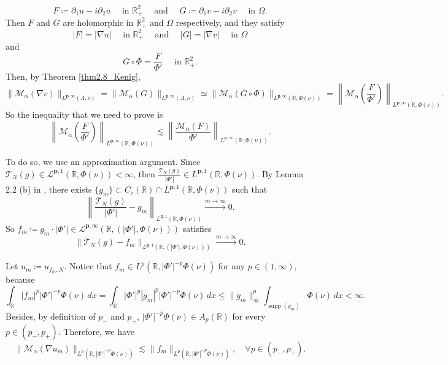 \documentclass[12pt]{amsart}
\newcommand{\R}{\mathbb{R}}
\newcommand{\supp}[1]{\operatorname{supp}\left(#1\right) }
\theoremstyle{plain}
\theoremstyle{definition}
\numberwithin{equation}{section}
\begin{document}
\[
F\coloneqq \partial_1 u-i\partial_2 u
\quad\text{ in }\R_{+}^{2}
\quad
\text{ and }
\quad 
G\coloneqq \partial_1 v-i\partial_2 v
\quad \text{ in }\Omega.
\]
Then $F$ and $G$ are holomorphic in $\R_{+}^{2}$ and $\Omega$ respectively, and they satisfy
\[
|F|=|\nabla u|
\quad\text{ in }\R_{+}^{2}
\quad
\text{ and }
\quad 
|G|=|\nabla v|
\quad\text{ in }\Omega
\]
and
\[
G\circ\Phi=\frac{F}{\Phi'}\quad \text{ in }\R_{+}^{2}.
\]
Then, by Theorem \ref{thm2.8_Kenig},
\[
\|\mathcal{M}_{\alpha}(\nabla v)\|_{L^{\bm{p},\infty}(\Lambda,\nu)}
=
\|\mathcal{M}_{\alpha}(G)\|_{L^{\bm{p},\infty}(\Lambda,\nu)}
\simeq 
\|\mathcal{M}_{\alpha}(G\circ\Phi)\|_{L^{\bm{p},\infty}(\R,\Phi(\nu))}
=
\left\|\mathcal{M}_{\alpha}\left(\frac{F}{\Phi'}\right)\right\|_{L^{\bm{p},\infty}(\R,\Phi(\nu))}.
\]
So the inequality that we need to prove is
\begin{equation}\label{eq:neededInequalityEndpoint}
\left\|\mathcal{M}_{\alpha}\left(\frac{F}{\Phi'}\right)\right\|_{L^{\bm{p},\infty}(\R,\Phi(\nu))}
\lesssim 
\left\|\frac{\mathcal{M}_{\alpha}(F)}{\Phi'}\right\|_{L^{\bm{p},\infty}(\R,\Phi(\nu))}.    
\end{equation}


To do so, we use an approximation argument. Since $\mathcal{T}_{N}(g)\in \mathcal{L}^{\bm{p},1}(\R,\Phi(\nu))<\infty$, then $\frac{\mathcal{T}_N(g)}{|\Phi'|}\in L^{\bm{p},1}(\R,\Phi(\nu))$. By Lemma 2.2 (b) in \cite{CNO}, there exists $\{g_m\}\subset C_c(\R)\cap L^{\bm{p},1}(\R,\Phi(\nu))$ such that 
\[
\left\|
\frac{\mathcal{T}_N(g)}{|\Phi'|}-g_m
\right\|_{L^{\bm{p},1}(\R,\Phi(\nu))}
\xrightarrow{m\to \infty}
0.
\]
So $f_m\coloneqq g_m\cdot |\Phi'|\in \mathcal{L}^{\bm{p},\infty}(\R,(|\Phi'|,\Phi(\nu)))$ satisfies
\[
\|\mathcal{T}_N(g)-f_m\|_{\mathcal{L}^{\bm{p},1}(\R,(|\Phi'|,\Phi(\nu)))}
\xrightarrow{m\to\infty}
0.
\]

Let $u_m\coloneqq u_{f_m,N}$. Notice that $f_m\in L^p(\R,|\Phi'|^{-p}\Phi(\nu))$ for any $p\in (1,\infty)$, because
\[
\int_{\R}|f_m|^p|\Phi'|^{-p}\Phi(\nu)\, dx 
=
\int_{\R}|\Phi'|^{p}|g_m|^p|\Phi'|^{-p}\Phi(\nu)\, dx
\leq 
\|g_m\|_{\infty}^p\int_{\supp{g_m}}\Phi(\nu)\, dx
<\infty. 
\]
Besides, by definition of $p_{-}$ and $p_{+}$, $|\Phi'|^{-p}\Phi(\nu)\in A_p(\R)$ for every $p\in (p_{-},p_{+})$. Therefore, we have
\[
\|\mathcal{M}_{\alpha}(\nabla u_m)\|_{L^p(\R,|\Phi'|^{-p}\Phi(\nu))}
\lesssim 
\|f_m\|_{L^p(\R,|\Phi'|^{-p}\Phi(\nu))},
\quad \forall p\in (p_{-},p_{+}).
\]
\end{document}
